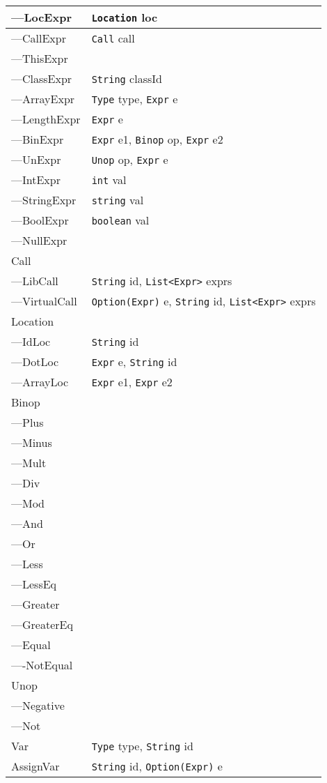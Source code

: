 \documentclass{article}
\begin{document}
\begin{longtable}{p{} | p{}}
    ---LocExpr & \texttt{Location} loc \\\hline
    ---CallExpr & \texttt{Call} call \\\hline
    ---ThisExpr & \\\hline
    ---ClassExpr & \texttt{String} classId \\\hline
    ---ArrayExpr & \texttt{Type} type, \texttt{Expr} e \\\hline
    ---LengthExpr & \texttt{Expr} e \\\hline
    ---BinExpr & \texttt{Expr} e1, \texttt{Binop} op, \texttt{Expr} e2 \\\hline
    ---UnExpr & \texttt{Unop} op, \texttt{Expr} e \\\hline
    ---IntExpr & \texttt{int} val \\\hline
    ---StringExpr & \texttt{string} val \\\hline
    ---BoolExpr & \texttt{boolean} val \\\hline
    ---NullExpr & \\\hline
    Call & \\\hline
    ---LibCall & \texttt{String} id, \texttt{List<Expr>} exprs \\\hline
    ---VirtualCall & \texttt{Option(Expr)} e, \texttt{String} id, \texttt{List<Expr>} exprs \\\hline
    Location & \\\hline
    ---IdLoc & \texttt{String} id \\\hline
    ---DotLoc & \texttt{Expr} e, \texttt{String} id \\\hline
    ---ArrayLoc & \texttt{Expr} e1, \texttt{Expr} e2 \\\hline
    Binop & \\\hline
    ---Plus & \\\hline
    ---Minus &  \\\hline
    ---Mult & \\\hline
    ---Div & \\\hline
    ---Mod & \\\hline
    ---And & \\\hline
    ---Or & \\\hline
    ---Less & \\\hline
    ---LessEq & \\\hline
    ---Greater & \\\hline
    ---GreaterEq & \\\hline
    ---Equal & \\\hline
    ----NotEqual & \\\hline
    Unop & \\\hline
    ---Negative & \\\hline
    ---Not & \\\hline
    Var & \texttt{Type} type, \texttt{String} id \\\hline
    AssignVar & \texttt{String} id, \texttt{Option(Expr)} e \\\hline
\end{longtable}
\end{document}
